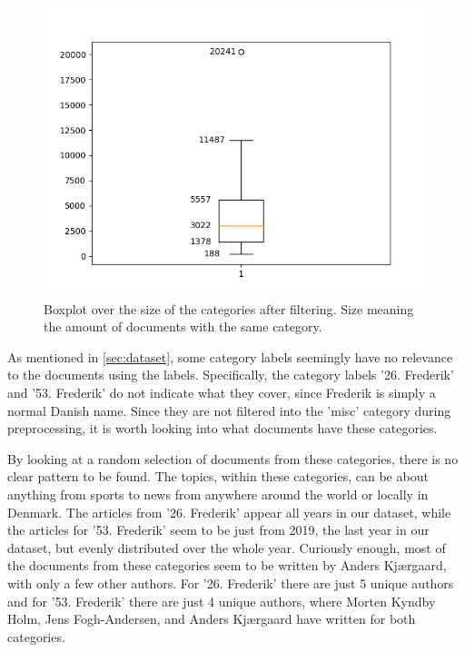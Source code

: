 \begin{figure}[b]
	\centering
	\includegraphics[width=.5\linewidth]{figures/category_box.png}
	\caption{Boxplot over the size of the categories after filtering. Size meaning the amount of documents with the same category.}
	\label{fig:category_box}
\end{figure}

As mentioned in \autoref{sec:dataset}, some category labels seemingly have no relevance to the documents using the labels.
Specifically, the category labels '26. Frederik' and '53. Frederik' do not indicate what they cover, since Frederik is simply a normal Danish name.
Since they are not filtered into the 'misc' category during preprocessing, it is worth looking into what documents have these categories.

By looking at a random selection of documents from these categories, there is no clear pattern to be found.
The topics, within these categories, can be about anything from sports to news from anywhere around the world or locally in Denmark.
The articles from '26. Frederik' appear all years in our dataset, while the articles for '53. Frederik' seem to be just from 2019, the last year in our dataset, but evenly distributed over the whole year.
Curiously enough, most of the documents from these categories seem to be written by Anders Kjærgaard, with only a few other authors.
For '26. Frederik' there are just 5 unique authors and for '53. Frederik' there are just 4 unique authors, where Morten Kyndby Holm, Jens Fogh-Andersen, and Anders Kjærgaard have written for both categories.

